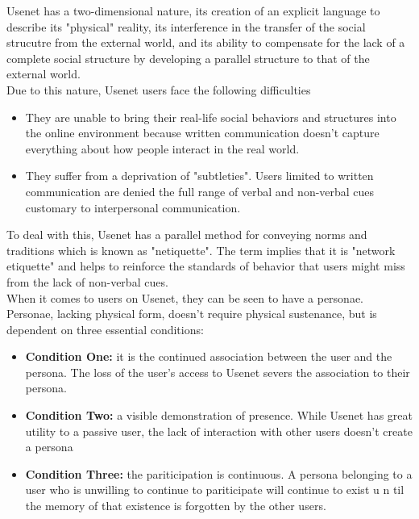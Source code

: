 \documentclass[a4paper]{article}
\begin{document}
\noindent Usenet has a two-dimensional nature, its creation of an explicit language to describe its "physical" reality,
its interference in the transfer of the social strucutre from the external world, and its ability to compensate for the 
lack of a complete social structure by developing a parallel structure to that of the external world. \\

\noindent Due to this nature, Usenet users face the following difficulties
\begin{itemize}
    \item They are unable to bring their real-life social behaviors and structures into the online environment because 
    written communication doesn't capture everything about how people interact in the real world.
    \item They suffer from a deprivation of "subtleties". Users limited to written communication are denied the full
    range of verbal and non-verbal cues customary to interpersonal communication.
\end{itemize}

\noindent To deal with this, Usenet has a parallel method for conveying norms and traditions which is known as 
"netiquette". The term implies that it is "network etiquette" and helps to reinforce the standards of behavior that 
users might miss from the lack of non-verbal cues. \\

\noindent When it comes to users on Usenet, they can be seen to have a personae. Personae, lacking physical form, 
doesn't require physical sustenance, but is dependent on three essential conditions:

\begin{itemize}
    \item \textbf{Condition One:} it is the continued association between the user and the persona. The loss of the 
    user's access to Usenet severs the association to their persona. 
    \item \textbf{Condition Two:} a visible demonstration of presence. While Usenet has great utility to a passive 
    user, the lack of interaction with other users doesn't create a persona
    \item \textbf{Condition Three:} the pariticipation is continuous. A persona belonging to a user who is unwilling
    to continue to pariticipate  will continue to exist u n til the memory of that existence is forgotten by the other 
    users.
\end{itemize}
\end{document}
